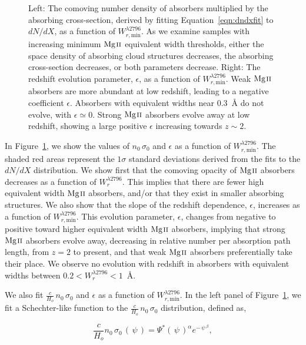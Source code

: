 \documentclass[iop,apj,numberedappendix,appendixfloats,twocolappendix]{emulateapj}
\begin{document}
\begin{figure*}[bth]
\caption{Left: The comoving number density of absorbers multiplied by the absorbing cross-section, derived by fitting Equation~\ref{eqn:dndxfit} to $dN\!/dX$, as a function of $W_{r,\mathrm{min}}^{\lambda2796}$. As we examine samples with increasing minimum ${\hbox{{\rm Mg}\kern 0.1em{\sc ii}}}$ equivalent width thresholds, either the space density of absorbing cloud structures decreases, the absorbing cross-section decreases, or both parameters decrease. Right: The redshift evolution parameter, $\epsilon$, as a function of $W_{r,\mathrm{min}}^{\lambda2796}$. Weak ${\hbox{{\rm Mg}\kern 0.1em{\sc ii}}}$ absorbers are more abundant at low redshift, leading to a negative coefficient $\epsilon$. Absorbers with equivalent widths near $0.3$~{\AA} do not evolve, with $\epsilon \simeq 0$. Strong ${\hbox{{\rm Mg}\kern 0.1em{\sc ii}}}$ absorbers evolve away at low redshift, showing a large positive $\epsilon$ increasing towards $z \sim 2$.}
\label{fig:nsigmaepsilon}
\end{figure*}

In Figure~\ref{fig:nsigmaepsilon}, we show the values of $n_0\,\sigma_0$ and $\epsilon$ as a function of $W_{r,\mathrm{min}}^{\lambda2796}$. The shaded red areas represent the $1\sigma$ standard deviations derived from the fits to the $dN\!/dX$ distribution. We show first that the comoving opacity of ${\hbox{{\rm Mg}\kern 0.1em{\sc ii}}}$ absorbers decreases as a function of $W_r^{\lambda2796}$. This implies that there are fewer high equivalent width ${\hbox{{\rm Mg}\kern 0.1em{\sc ii}}}$ absorbers, and/or that they exist in smaller absorbing structures. We also show that the slope of the redshift dependence, $\epsilon$, increases as a function of $W_{r,\mathrm{min}}^{\lambda2796}$. This evolution parameter, $\epsilon$, changes from negative to positive toward higher equivalent width ${\hbox{{\rm Mg}\kern 0.1em{\sc ii}}}$ absorbers, implying that strong ${\hbox{{\rm Mg}\kern 0.1em{\sc ii}}}$ absorbers evolve away, decreasing in relative number per absorption path length, from $z = 2$ to present, and that weak ${\hbox{{\rm Mg}\kern 0.1em{\sc ii}}}$ absorbers preferentially take their place. We observe no evolution with redshift in absorbers with equivalent widths between $0.2 < W_r^{\lambda2796} < 1$~{\AA}.

We also fit $\frac{c}{H_o}\,n_0\,\sigma_0$ and $\epsilon$ as a function of $W_{r,\mathrm{min}}^{\lambda2796}$. In the left panel of Figure~\ref{fig:nsigmaepsilon}, we fit a Schechter-like function to the $\frac{c}{H_o}\,n_0\,\sigma_0$ distribution, defined as,

\begin{equation}
\frac{c}{H_o}n_0\,\sigma_0\,(\,\psi\,) = \Psi^* (\,\psi\,)^{\alpha} e^{-\,\psi\,^{\beta}} ,
\label{eqn:nsigmafit}
\end{equation}
\end{document}
